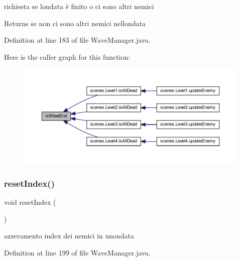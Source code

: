 richiesta se l\textquotesingle{}ondata è finito o ci sono altri nemici 

\begin{DoxyReturn}{Returns}
se non ci sono altri nemici nell\textquotesingle{}ondata 
\end{DoxyReturn}


Definition at line 183 of file Wave\+Manager.\+java.

Here is the caller graph for this function\+:\nopagebreak
\begin{figure}[H]
\begin{center}
\leavevmode
\includegraphics[width=350pt]{classmanagers_1_1_wave_manager_a1012ba37c40b76ee9c3413986133d865_icgraph}
\end{center}
\end{figure}
\mbox{\label{classmanagers_1_1_wave_manager_a73337f83fd9fb6c3398a8cf359422508}} 
\subsubsection{\texorpdfstring{reset\+Index()}{resetIndex()}}
{\footnotesize\ttfamily void reset\+Index (\begin{DoxyParamCaption}{ }\end{DoxyParamCaption})}



azzeramento index dei nemici in un\textquotesingle{}ondata 



Definition at line 199 of file Wave\+Manager.\+java.

